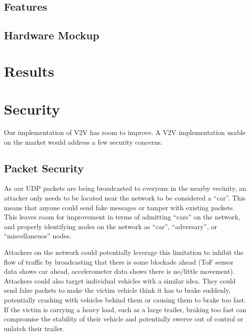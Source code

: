 \documentclass[conference]{IEEEtran}
\begin{document}
\subsection{Features}

\subsection{Hardware Mockup}

\section{Results}

%

\section{Security}
Our implementation of V2V has room to improve. A V2V implementation usable on
the market would address a few security concerns.

\subsection{Packet Security}
As our UDP packets are being broadcasted to everyone in the nearby vecinity, an
attacker only needs to be located near the network to be considered a ``car''.
This means that anyone could send fake messages or tamper with existing packets.
This leaves room for improvement in terms of admitting ``cars'' on the network,
and properly identifying nodes on the network as ``car'', ``adversary'', or
``miscellaneuos'' nodes.

Attackers on the network could potentially leverage this limitation to inhibit
the flow of traffic by broadcasting that there is some blockade ahead (ToF
sensor data shows car ahead, accelerometer data shows there is no/little
movement). Attackers could also target individual vehicles with a similar idea.
They could send false packets to make the victim vehicle think it has to brake
suddenly, potentially crashing with vehicles behind them or causing them to
brake too fast. If the victim is carrying a heavy load, such as a large trailer,
braking too fast can compromise the stability of their vehicle and potentially
swerve out of control or unlatch their trailer.
\end{document}
